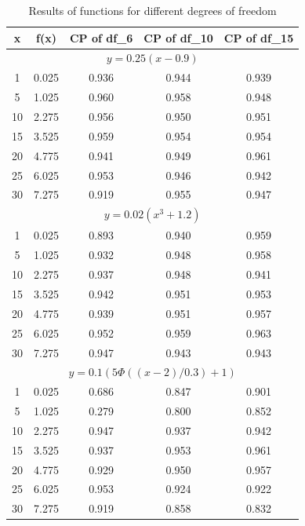 \documentclass[12pt]{article}
\begin{document}
\begin{table}[ht]
  \centering
  \label{Table}
  \caption{Results of functions for different degrees of freedom}
  \begin{tabular}{|c|c|c|c|c|}
    \hline
    \textbf{x} & \textbf{f(x)} & \textbf{CP of df\_6} & \textbf{CP of df\_10} & \textbf{CP of df\_15} \\
    \hline
    \multicolumn{5}{|c|}{\(y = 0.25(x - 0.9)\)} \\
    \hline
    1 & 0.025 & 0.936 & 0.944 & 0.939 \\
    \hline
    5 & 1.025 & 0.960 & 0.958 & 0.948 \\
    \hline
    10 & 2.275 & 0.956 & 0.950 & 0.951 \\
    \hline
    15 & 3.525 & 0.959 & 0.954 & 0.954 \\
    \hline
    20 & 4.775 & 0.941 & 0.949 & 0.961 \\
    \hline
    25 & 6.025 & 0.953 & 0.946 & 0.942 \\
    \hline
    30 & 7.275 & 0.919 & 0.955 & 0.947 \\
    \hline
    \multicolumn{5}{|c|}{\(y = 0.02(x^3+1.2)\)} \\
    \hline
    1 & 0.025 & 0.893 & 0.940 & 0.959 \\
    \hline
    5 & 1.025 & 0.932 & 0.948 & 0.958 \\
    \hline
    10 & 2.275 & 0.937 & 0.948 & 0.941 \\
    \hline
    15 & 3.525 & 0.942 & 0.951 & 0.953 \\
    \hline
    20 & 4.775 & 0.939 & 0.951 & 0.957 \\
    \hline
    25 & 6.025 & 0.952 & 0.959 & 0.963 \\
    \hline
    30 & 7.275 & 0.947 & 0.943 & 0.943 \\
    \hline
    \multicolumn{5}{|c|}{\(y = 0.1 (5\Phi((x - 2) / 0.3) + 1)\)} \\
    \hline
    1 & 0.025 & 0.686 & 0.847 & 0.901 \\
    \hline
    5 & 1.025 & 0.279 & 0.800 & 0.852 \\
    \hline
    10 & 2.275 & 0.947 & 0.937 & 0.942 \\
    \hline
    15 & 3.525 & 0.937 & 0.953 & 0.961 \\
    \hline
    20 & 4.775 & 0.929 & 0.950 & 0.957 \\
    \hline
    25 & 6.025 & 0.953 & 0.924 & 0.922 \\
    \hline
    30 & 7.275 & 0.919 & 0.858 & 0.832 \\
    \hline
  \end{tabular}
\end{table}
\end{document}
